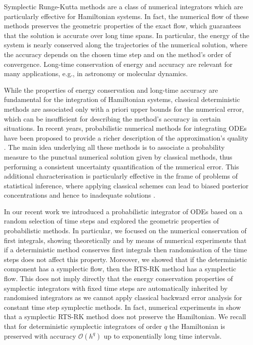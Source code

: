 \documentclass{siamart1116}
\numberwithin{theorem}{section}
\newcommand{\OO}{\mathcal{O}}
\begin{document}
Symplectic Runge-Kutta methods are a class of numerical integrators which are particularly effective for Hamiltonian systems. In fact, the numerical flow of these methods preserves the geometric properties of the exact flow, which guarantees that the solution is accurate over long time spans. In particular, the energy of the system is nearly conserved along the trajectories of the numerical solution, where the accuracy depends on the chosen time step and on the method's order of convergence. Long-time conservation of energy and accuracy are relevant for many applications, e.g., in astronomy or molecular dynamics.

While the properties of energy conservation and long-time accuracy are fundamental for the integration of Hamiltonian systems, classical deterministic methods are associated only with a priori upper bounds for the numerical error, which can be insufficient for describing the method's accuracy in certain situations. In recent years, probabilistic numerical methods for integrating ODEs have been proposed  to provide a richer description of the approximation's quality \cite{AbG18, CGS16, KeH16, CCC16, SSH18}. The main idea underlying all these methods is to associate a probability measure to the punctual numerical solution given by classical methods, thus performing a consistent uncertainty quantification of the numerical error. This additional characterisation is particularly effective in the frame of problems of statistical inference, where applying classical schemes can lead to biased posterior concentrations and hence to inadequate solutions \cite{AbG18, COS17, CGS16}.

In our recent work \cite{AbG18} we introduced a probabilistic integrator of ODEs based on a random selection of time steps and explored the geometric properties of probabilistic methods. In particular, we focused on the numerical conservation of first integrals, showing theoretically and by means of numerical experiments that if a deterministic method conserves first integrals then randomisation of the time steps does not affect this property. Moreover, we showed that if the deterministic component has a symplectic flow, then the RTS-RK method has a symplectic flow. This does not imply directly that the energy conservation properties of symplectic integrators with fixed time steps are automatically inherited by randomised integrators as we cannot apply classical backward error analysis for constant time step symplectic methods. In fact, numerical experiments in \cite{AbG18} show that a symplectic RTS-RK method does not preserve the Hamiltonian. We recall that for deterministic symplectic integrators of order $q$ the Hamiltonian is preserved with accuracy $\OO(h^q)$ up to exponentially long time intervals.
\end{document}
